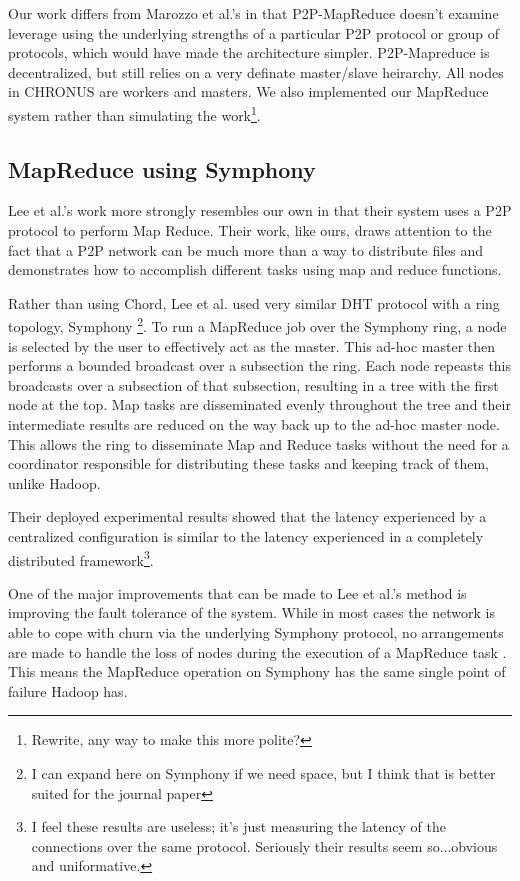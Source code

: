 \documentclass[conference, compsocconf, letterpaper]{IEEEtran}
\begin{document}
Our work differs from Marozzo et al.'s in that P2P-MapReduce doesn't examine leverage using the underlying strengths of a particular P2P protocol or group of protocols, which would have made the architecture simpler.  P2P-Mapreduce is decentralized, but still relies on a very definate master/slave heirarchy.  All nodes in CHRONUS are workers and masters.  We also implemented our MapReduce system rather than simulating the work\footnote{Rewrite, any way to make this more polite?}.

\subsection{MapReduce using Symphony}
Lee et al.'s work more strongly resembles our own in that their system uses a P2P protocol to perform Map Reduce\cite{leemap}.  Their work, like ours, draws attention to the fact that a P2P network can be much more than a way to distribute files and demonstrates how to accomplish different tasks using map and reduce functions.

Rather than using Chord, Lee et al. used very similar DHT protocol with a ring topology, Symphony \cite{symphony}\footnote{I can expand here on Symphony if we need space, but I think that is better suited for the journal paper}.  To run a MapReduce job over the Symphony ring, a node is selected by the user to effectively act as the master.  This ad-hoc master then performs a bounded broadcast over a subsection the ring.  Each node repeasts this broadcasts over a subsection of that subsection, resulting in a tree with the first node at the top.  Map tasks are disseminated evenly throughout the tree and their intermediate results are reduced on the way back up to the ad-hoc master node.  This allows the ring to disseminate Map and Reduce tasks without the need for a coordinator responsible for distributing these tasks and keeping track of them, unlike Hadoop.
 

Their deployed experimental results showed that the latency experienced by a centralized configuration is similar to the latency experienced in a completely distributed framework\footnote{I feel these results are useless; it's just measuring the latency of the connections over the same protocol.  Seriously their results seem so...obvious and uniformative.}.

One of the major improvements that can be made to Lee et al.'s method is improving the fault tolerance of the system.  While in most cases the network is able to cope with churn via the underlying Symphony protocol, no arrangements are made to handle the loss of nodes during the execution of a MapReduce task \cite{leemap}.  This means the MapReduce operation on Symphony has the same single point of failure Hadoop has. 
\end{document}
